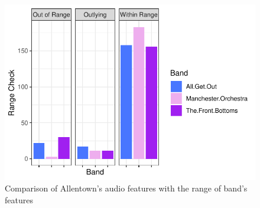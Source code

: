\documentclass{article}\usepackage[]{graphicx}\usepackage[]{xcolor}
\makeatletter
\def\maxwidth{ %
  \ifdim\Gin@nat@width>\linewidth
    \linewidth
  \else
    \Gin@nat@width
  \fi
}
\newenvironment{knitrout}{}{} %
\makeatother
\begin{document}
\begin{figure}[H] \begin{center}
\begin{knitrout}
\color{fgcolor}
\includegraphics[width=\maxwidth]{figure/unnamed-chunk-7-1} 
\end{knitrout}
\caption{Comparison of Allentown's audio features with the range of band's features} \label{plot.allen}
\end{center}
\end{figure}
\end{document}
